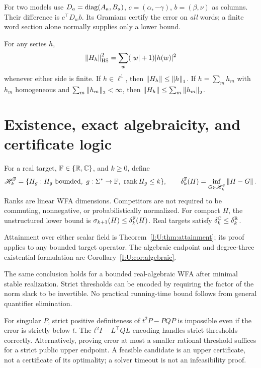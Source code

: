 For two models use $D_a=\operatorname{diag}(A_a,B_a)$, $c=(\alpha,-\gamma)$, $b=(\beta,\nu)$ as columns. Their difference is $c^\top D_wb$. Its Gramians certify the error on \emph{all} words; a finite word section alone normally supplies only a lower bound.

\begin{proposition}\label{I:S:prop:normbounds}
For any series $h$,
\[
 \left\lVert H_h\right\rVert_{\mathrm{HS}}^2=\sum_w(|w|+1)|h(w)|^2
\]
whenever either side is finite. If $h\in\ell^1$, then $\left\lVert H_h\right\rVert\le\left\lVert h\right\rVert_1$. If $h=\sum_m h_m$ with $h_m$ homogeneous and $\sum_m\left\lVert h_m\right\rVert_2<\infty$, then $\left\lVert H_h\right\rVert\le\sum_m\left\lVert h_m\right\rVert_2$.
\end{proposition}


\section{Existence, exact algebraicity, and certificate logic}\label{I:S:sec:global}
For a real target, $\mathbb F\in\{\mathbb R,\mathbb C\}$, and $k\ge0$, define
\[
 \mathscr H_k^{\mathbb F}=\{H_g:H_g\text{ bounded},\ g:\Sigma^*\to\mathbb F,\ \operatorname{rank} H_g\le k\},
 \qquad \delta_{k}^{\mathbb F}(H)=\inf_{G\in\mathscr H_k^{\mathbb F}}\left\lVert H-G\right\rVert.
\]
Ranks are linear WFA dimensions. Competitors are not required to be commuting, nonnegative, or probabilistically normalized. For compact $H$, the unstructured lower bound is $\sigma_{k+1}(H)\le\delta_{k}^{\mathbb F}(H)$. Real targets satisfy $\delta_k^\mathbb C\le\delta_k^\mathbb R$.

Attainment over either scalar field is Theorem~\ref{I:U:thm:attainment};
its proof applies to any bounded target operator. The algebraic endpoint
and degree-three existential formulation are Corollary~\ref{I:U:cor:algebraic}.

The same conclusion holds for a bounded real-algebraic WFA after minimal
stable realization. Strict thresholds can be encoded by requiring the
factor of the norm slack to be invertible. No practical running-time
bound follows from general quantifier elimination.

\begin{remark}
For singular $P$, strict positive definiteness of $t^2P-PQP$ is impossible even if the error is strictly below $t$. The $t^2I-L^\top QL$ encoding handles strict thresholds correctly. Alternatively, proving error at most a smaller rational threshold suffices for a strict public upper endpoint. A feasible candidate is an upper certificate, not a certificate of its optimality; a solver timeout is not an infeasibility proof.
\end{remark}

